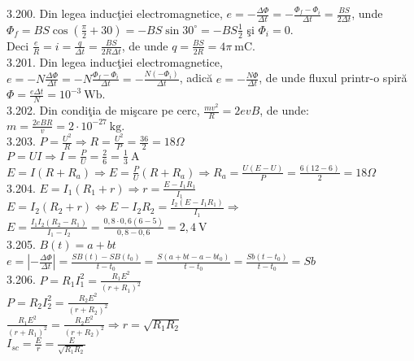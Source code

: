 3.200. Din legea inducţiei electromagnetice, $e=-\frac{\Delta \Phi}{\Delta t}=-\frac{\Phi_{f}-\Phi_{i}}{\Delta t}=\frac{B S}{2 \Delta t}$, unde $\Phi_{f}=B S \cos \left(\frac{\pi}{2}+30\right)=-B S \sin 30^{\circ}=-B S \frac{1}{2}$ şi $\Phi_{i}=0$.\\ Deci $\frac{e}{R}=i=\frac{q}{\Delta t}=\frac{B S}{2 R \Delta t}$, de unde $q=\frac{B S}{2 R}=4 \pi \mathrm{~mC}$.\\

3.201. Din legea inducţiei electromagnetice,\\$e=-N \frac{\Delta \Phi}{\Delta t}=-N \frac{\Phi_{f}-\Phi_{i}}{\Delta t}=-\frac{N\left(-\Phi_{i}\right)}{\Delta t}$, adică $e=-\frac{N \Phi}{\Delta t}$, de unde fluxul printr-o spiră $\Phi=\frac{e \Delta t}{N}=10^{-3} \mathrm{~Wb}$.\\

3.202. Din condiţia de mişcare pe cerc, $\frac{m v^{2}}{R}=2 e v B$, de unde:\\$m=\frac{2 e B R}{v}=2 \cdot 10^{-27} \mathrm{~kg} .$\\

3.203. $P=\frac{U^{2}}{R} \Rightarrow R=\frac{U^{2}}{P}=\frac{36}{2}=18 \Omega$\\$P=U I \Rightarrow I=\frac{P}{U}=\frac{2}{6}=\frac{1}{3} \mathrm{~A}$\\$E=I\left(R+R_{a}\right) \Rightarrow E=\frac{P}{U}\left(R+R_{a}\right) \Rightarrow R_{a}=\frac{U(E-U)}{P}=\frac{6(12-6)}{2}=18 \Omega$\\

3.204. $E=I_{1}\left(R_{1}+r\right) \Rightarrow r=\frac{E-I_{1} R_{1}}{I_{1}}$\\$E=I_{2}\left(R_{2}+r\right) \Leftrightarrow E-I_{2} R_{2}=\frac{I_{2}\left(E-I_{1} R_{1}\right)}{I_{1}} \Rightarrow$\\$E=\frac{I_{1} I_{2}\left(R_{2}-R_{1}\right)}{I_{1}-I_{2}}=\frac{0,8 \cdot 0,6(6-5)}{0,8-0,6}=2,4 \mathrm{~V}$\\

3.205. $B(t)=a+b t$\\ $e=\left|-\frac{\Delta \Phi}{\Delta t}\right|=\frac{S B(t)-S B\left(t_{0}\right)}{t-t_{0}}=\frac{S\left(a+b t-a-b t_{0}\right)}{t-t_{0}}=\frac{S b\left(t-t_{0}\right)}{t-t_{0}}=S b$\\

3.206. $P=R_{1} I_{1}^{2}=\frac{R_{1} E^{2}}{\left(r+R_{1}\right)^{2}}$\\ $P=R_{2} I_{2}^{2}=\frac{R_{2} E^{2}}{\left(r+R_{2}\right)^{2}}$\\ $\frac{R_{1} E^{2}}{\left(r+R_{1}\right)^{2}}=\frac{R_{2} E^{2}}{\left(r+R_{2}\right)^{2}} \Rightarrow r=\sqrt{R_{1} R_{2}}$\\ $I_{s c}=\frac{E}{r}=\frac{E}{\sqrt{R_{1} R_{2}}}$\\

